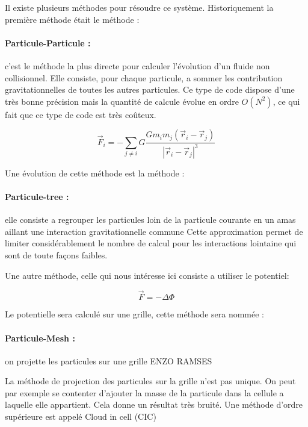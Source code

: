 Il existe plusieurs méthodes pour résoudre ce système.
Historiquement la première méthode était le méthode :

\paragraph{Particule-Particule : } c'est le méthode la plus directe pour calculer l'évolution d'un fluide non collisionnel. 
Elle consiste, pour chaque particule, a sommer les contribution gravitationnelles de toutes les autres particules.
Ce type de code dispose d'une très bonne précision mais la quantité de calcule évolue en ordre $O(N^2)$, ce qui fait que ce type de code est très coûteux.

\begin{equation}
\vec{F}_i=-\sum_{j\neq i} G \frac{G m_i m_j(\vec{r}_i - \vec{r}_j) }{ |\vec{r}_i - \vec{r}_j |^3}
\end{equation}

Une évolution de cette méthode est la méthode :

\paragraph{Particule-tree : } elle  consiste a regrouper les particules loin de la particule courante en un amas aillant une interaction gravitationnelle commune
Cette approximation permet de limiter considérablement le nombre de calcul pour les interactions lointaine qui sont de toute façons faibles.


Une autre méthode, celle qui nous intéresse ici consiste a utiliser le potentiel:


\begin{equation}
\vec{F}=-\Delta \Phi
\end{equation}

Le potentielle sera calculé sur une grille, cette méthode sera nommée :
\paragraph{Particule-Mesh : } on projette les particules sur une grille
ENZO %
RAMSES

La méthode de projection des particules sur la grille n'est pas unique.
On peut par exemple se contenter d'ajouter la masse de la particule dans la cellule a laquelle elle appartient.
Cela donne un résultat très bruité.
Une méthode d'ordre supérieure est appelé Cloud in cell (CIC)

